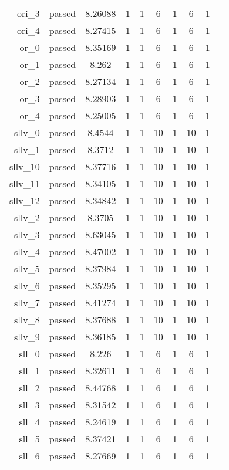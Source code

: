 \begin{longtable}{r|ccccccccc}
    ori\_3 & passed & 8.26088 & 1 & 1 & 6 & 1 & 6 & 1 \\
    ori\_4 & passed & 8.27415 & 1 & 1 & 6 & 1 & 6 & 1 \\
    or\_0 & passed & 8.35169 & 1 & 1 & 6 & 1 & 6 & 1 \\
    or\_1 & passed & 8.262 & 1 & 1 & 6 & 1 & 6 & 1 \\
    or\_2 & passed & 8.27134 & 1 & 1 & 6 & 1 & 6 & 1 \\
    or\_3 & passed & 8.28903 & 1 & 1 & 6 & 1 & 6 & 1 \\
    or\_4 & passed & 8.25005 & 1 & 1 & 6 & 1 & 6 & 1 \\
    sllv\_0 & passed & 8.4544 & 1 & 1 & 10 & 1 & 10 & 1 \\
    sllv\_1 & passed & 8.3712 & 1 & 1 & 10 & 1 & 10 & 1 \\
    sllv\_10 & passed & 8.37716 & 1 & 1 & 10 & 1 & 10 & 1 \\
    sllv\_11 & passed & 8.34105 & 1 & 1 & 10 & 1 & 10 & 1 \\
    sllv\_12 & passed & 8.34842 & 1 & 1 & 10 & 1 & 10 & 1 \\
    sllv\_2 & passed & 8.3705 & 1 & 1 & 10 & 1 & 10 & 1 \\
    sllv\_3 & passed & 8.63045 & 1 & 1 & 10 & 1 & 10 & 1 \\
    sllv\_4 & passed & 8.47002 & 1 & 1 & 10 & 1 & 10 & 1 \\
    sllv\_5 & passed & 8.37984 & 1 & 1 & 10 & 1 & 10 & 1 \\
    sllv\_6 & passed & 8.35295 & 1 & 1 & 10 & 1 & 10 & 1 \\
    sllv\_7 & passed & 8.41274 & 1 & 1 & 10 & 1 & 10 & 1 \\
    sllv\_8 & passed & 8.37688 & 1 & 1 & 10 & 1 & 10 & 1 \\
    sllv\_9 & passed & 8.36185 & 1 & 1 & 10 & 1 & 10 & 1 \\
    sll\_0 & passed & 8.226 & 1 & 1 & 6 & 1 & 6 & 1 \\
    sll\_1 & passed & 8.32611 & 1 & 1 & 6 & 1 & 6 & 1 \\
    sll\_2 & passed & 8.44768 & 1 & 1 & 6 & 1 & 6 & 1 \\
    sll\_3 & passed & 8.31542 & 1 & 1 & 6 & 1 & 6 & 1 \\
    sll\_4 & passed & 8.24619 & 1 & 1 & 6 & 1 & 6 & 1 \\
    sll\_5 & passed & 8.37421 & 1 & 1 & 6 & 1 & 6 & 1 \\
    sll\_6 & passed & 8.27669 & 1 & 1 & 6 & 1 & 6 & 1 \\

\end{longtable}
